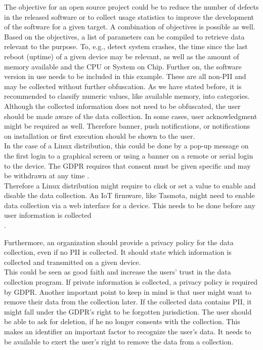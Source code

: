         The objective for an open source project could be to reduce the number of defects in the released software or to collect usage statistics to improve the development of the software for a given target. A combination of objectives is possible as well.\\
        Based on the objectives, a list of parameters can be compiled to retrieve data relevant to the purpose.
        To, e.g., detect system crashes, the time since the last reboot (uptime) of a given device may be relevant, as well as the amount of memory available and the CPU or System on Chip. Further on, the software version in use needs to be included in this example. These are all non-PII and may be collected without further obfuscation. As we have stated before, it is recommended to classify numeric values, like available memory, into categories.\\
        
        Although the collected information does not need to be obfuscated, the user should be made aware of the data collection. In some cases, user acknowledgment might be required as well. Therefore banner, push notifications, or notifications on installation or first execution should be shown to the user. \\
        In the case of a Linux distribution, this could be done by a pop-up message on the first login to a graphical screen or using a banner on a remote or serial login to the device.
        The GDPR requires that consent must be given specific and may be withdrawn at any time \cite{noauthor_gdpr_2020}.\\ 
        Therefore a Linux distribution might require to click or set a value to enable and disable the data collection. An IoT firmware, like Tasmota, might need to enable data collection via a web interface for a device. This needs to be done before any user information is collected\\. 
        
        Furthermore, an organization should provide a privacy policy for the data collection, even if no PII is collected. It should state which information is collected and transmitted on a given device.\\
        This could be seen as good faith and increase the users' trust in the data collection program. If private information is collected, a privacy policy is required by GDPR. Another important point to keep in mind is that user might want to remove their data from the collection later. If the collected data contains PII, it might fall under the GDPR's right to be forgotten jurisdiction. The user should be able to ask for deletion, if he no longer consents with the collection.
        This makes an identifier an important factor to recognize the user's data. It needs to be available to exert the user's right to remove the data from a collection.
        
